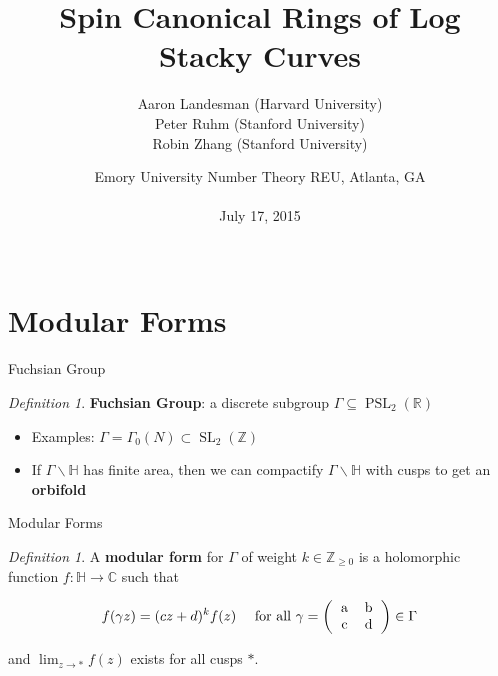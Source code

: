 \documentclass{beamer}
\title{Spin Canonical Rings of Log Stacky Curves}
\author[A. Landesman, P. Ruhm, and R. Zhang]{
Aaron Landesman (Harvard University) \\
Peter Ruhm (Stanford University) \\
Robin Zhang (Stanford University)
}
\date[July 17, 2015]{
Emory University Number Theory REU, Atlanta, GA\\
\mbox{}\\
July 17, 2015\\
\mbox{}\\
}
\theoremstyle{remark}
\newtheorem{defn}[thm]{Definition}
\newcommand\BH{{\mathbb H}}
\newcommand\BC{{\mathbb C}}
\newcommand\BR{{\mathbb R}}
\newcommand\BZ{{\mathbb Z}}
\newcommand{\SL}{\operatorname{SL}}
\newcommand{\PSL}{\operatorname{PSL}}
\begin{document}
\begin{frame}
	\titlepage
\end{frame}

\section{Modular Forms} 

\begin{frame}{Fuchsian Group}

\begin{defn}
{\bf Fuchsian Group}: a discrete subgroup $\Gamma \subseteq \PSL_2(\BR)$
\end{defn}


\begin{itemize}
\item Examples: $\Gamma = \Gamma_0(N) \subset \SL_2(\BZ)$\\
\item If $\Gamma \backslash \BH$ has finite area, then we can compactify $\Gamma \backslash \BH$ with cusps to get an {\bf orbifold} 
\end{itemize}

\end{frame}


\begin{frame}{Modular Forms}

\begin{defn}
A \textbf{modular form} for $\Gamma$ of weight $k \in \BZ_{\geq 0}$ is a holomorphic function $f \colon \BH \to \BC$ such that

\begin{align*}
	&f(\gamma z) = (cz+d)^k f(z) &\text{ for all } \gamma = \left(\begin{tabular}{c c} a & b \\ c & d \end{tabular} \right)\in \Gamma 
\end{align*}

\noindent
and $\lim_{z \to *} f(z)$ exists for all cusps $*$.
\end{defn}



\end{frame}
\end{document}
